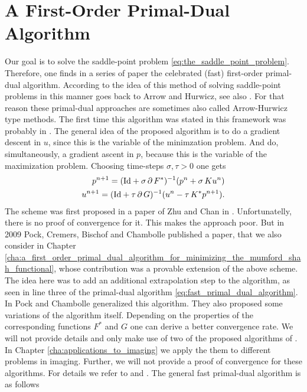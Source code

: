 \section{A First-Order Primal-Dual Algorithm} %
\label{sec:a_firs_order_primal_dual_algorithm}

    Our goal is to solve the saddle-point problem \ref{eq:the_saddle_point_problem}. Therefore, one finds in a series of paper the celebrated (fast) first-order primal-dual algorithm. According to \cite{Chambolle-et-al-10} the idea of this method of solving saddle-point problems in this manner goes back to Arrow and Hurwicz, see also \cite{Arrow-Hurwicz}. For that reason these primal-dual approaches are sometimes also called Arrow-Hurwicz type methods. The first time this algorithm was stated in this framework was probably in \cite{Appleton-Talbot}. The general idea of the proposed algorithm is to do a gradient descent in $u$, since this is the variable of the minimzation problem. And do, simultaneously, a gradient ascent in $p$, because this is the variable of the maximization problem. Choosing time-steps $\sigma, \tau > 0$ one gets
        \begin{eqnarray}
            p^{n+1} = (\textnormal{Id} + \sigma\,\partial\,F^{\ast})^{-1}(p^{n} + \sigma\,Ku^{n}) \notag \\
            u^{n+1} = (\textnormal{Id} + \tau\,\partial\,G)^{-1}(u^{n} - \tau\,K^{\ast}p^{n+1}). \notag
        \end{eqnarray}
    The scheme was first proposed in a paper of Zhu and Chan in \cite{Zhu-Chan}. Unfortunatelly, there is no proof of convergence for it. This makes the approach poor. But in 2009 Pock, Cremers, Bischof and Chambolle published a paper, that we also consider in Chapter \ref{cha:a_first_order_primal_dual_algorithm_for_minimizing_the_mumford_shah_functional}, whose contribution was a provable extension of the above scheme. The idea here was to add an additional extrapolation step to the algorithm, as seen in line three of the primal-dual algorithm \ref{eq:fast_primal_dual_algorithm}. In \cite{Chambolle10afirst-order} Pock and Chambolle generalized this algorithm. They also proposed some variations of the algorithm itself. Depending on the properties of the corresponding functions $F^{\ast}$ and $G$ one can derive a better convergence rate. We will not provide details and only make use of two of the proposed algorithms of \cite{Pock-et-al-iccv09}. In Chapter \ref{cha:applications_to_imaging} we apply the them to different problems in imaging. Further, we will not provide a proof of convergence for these algorithms. For details we refer to \cite{Chambolle10afirst-order} and \cite{Pock-et-al-iccv09}. The general fast primal-dual algorithm is as follows

